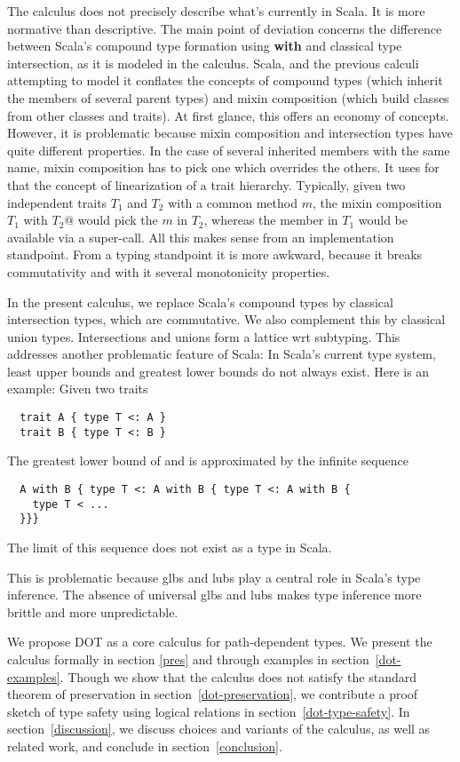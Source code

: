 \documentclass[9pt]{sigplanconf}
\begin{document}
The calculus does not precisely describe what's currently in Scala. It
is more normative than descriptive. The main point of deviation
concerns the difference between Scala's compound type formation using
{\bf with} and classical type intersection, as it is modeled in the
calculus. Scala, and the previous calculi attempting to model it
conflates the concepts of compound types (which inherit the members of
several parent types) and mixin composition (which build classes from
other classes and traits). At first glance, this offers an economy of
concepts. However, it is problematic because mixin composition and
intersection types have quite different properties. In the case of
several inherited members with the same name, mixin composition has to
pick one which overrides the others. It uses for that the concept of
linearization of a trait hierarchy. Typically, given two independent
traits $T_1$ and $T_2$ with a common method $m$, the mixin composition
\code@$T_1$ with $T_2$@ would pick the $m$ in $T_2$, whereas the member in
$T_1$ would be available via a super-call. All this makes sense from
an implementation standpoint. From a typing standpoint it is more
awkward, because it breaks commutativity and with it several
monotonicity properties.

In the present calculus, we replace Scala's compound types by
classical intersection types, which are commutative. We also
complement this by classical union types. Intersections and unions
form a lattice wrt subtyping. This addresses another problematic
feature of Scala: In Scala's current type system, least upper bounds
and greatest lower bounds do not always exist. Here is an example:
Given two traits
\begin{lstlisting}
  trait A { type T <: A }
  trait B { type T <: B }
\end{lstlisting}
The greatest lower bound of \code@A@ and \code@B@ is approximated by the
infinite sequence
\begin{lstlisting}
  A with B { type T <: A with B { type T <: A with B {
    type T < ...
  }}}
\end{lstlisting}
The limit of this sequence does not exist as a type in Scala.

This is problematic because glbs and lubs play a central role in
Scala's type inference. The absence of universal glbs and lubs makes
type inference more brittle and more unpredictable.

We propose DOT as a core calculus for path-dependent types. We present
the calculus formally in section \ref{pres} and through examples in
section~\ref{dot-examples}. Though we show that the calculus does not
satisfy the standard theorem of preservation in
section~\ref{dot-preservation}, we contribute a proof sketch of type
safety using logical relations in section~\ref{dot-type-safety}. In
section~\ref{discussion}, we discuss choices and variants of the
calculus, as well as related work, and conclude in
section~\ref{conclusion}.
\end{document}
